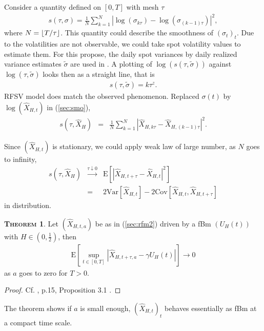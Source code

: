 \documentclass[a4paper, twoside, 11pt]{article}
\theoremstyle{definition}
\newtheorem{theorem}[definition]{\scshape Theorem}
\DeclarePairedDelimiter\floor{\lfloor}{\rfloor}
\begin{document}
Consider a quantity defined on $[0, T]$ with mesh $\tau$
\begin{eqnarray}
  s(\tau, \sigma) = \frac{1}{N}\sum\limits_{k=1}^N|\log(\sigma_{k\tau}) - \log(\sigma_{(k-1)\tau})|^2,
  \label{sec:smo}
\end{eqnarray}
where $N = \floor{T/\tau}$. This quantity could describe the smoothness of $(\sigma_t)_t$. Due to the volatilities are not observable, we could take spot volatility values to estimate them. For this propose, the daily spot variances by daily realized variance estimates $\tilde{\sigma}$ are used in \cite{chridito}. A plotting of $\log(s(\tau, \tilde{\sigma}))$ against $\log(\tau, \tilde{\sigma})$ looks then as a straight line, that is
\begin{eqnarray}
  s(\tau, \tilde{\sigma}) =  k\tau^z.
  \label{sec:smth}
\end{eqnarray}
RFSV model does match the observed phenomenon. Replaced  $\sigma(t)$ by $\log(\hat{X}_{H,t})$ in (\ref{sec:smo}),
\begin{eqnarray}
  s(\tau, \hat{X}_{H}) &=&  \frac {1}{N}\sum\limits_{k=1}^N|\hat{X}_{H,k\tau} - \hat{X}_{H,(k-1)\tau}|^2\nonumber.
\end{eqnarray}

Since $(\hat{X}_{H,t})$ is stationary, we could apply weak law of large number, as $N$ goes to infinity,
\begin{eqnarray}
  s(\tau, \hat{X}_{H}) &\overset{\tau\downarrow0}{\rightarrow}& \mathrm{E}[|\hat{X}_{H,t+\tau}-\hat{X}_{H,t}|^2]\nonumber\\
  &=& 2 \mathrm{Var}[\hat{X}_{H,t}] - 2 \mathrm{Cov}[\hat{X}_{H,t}, \hat{X}_{H,t+\tau}]\nonumber
  \label{sec:smtsv}
\end{eqnarray}
in distribution.
\begin{theorem}
  Let $(\hat{X}_{H, t, a})$ be as in (\ref{sec:rfm2}) driven by a fBm $(U_H(t))$ with $H\in (0,\frac{1}{2})$, then
  \begin{eqnarray*}
	\mathrm{E}[\sup\limits_{t\in [0, T]}|\hat{X}_{H,t+\tau, a} - \gamma U_H(t)|]\rightarrow 0
  \end{eqnarray*}
 as $a$ goes to zero for $T > 0$.
\end{theorem}
\begin{proof}
  Cf. \cite{gradin}, p.15, Proposition 3.1 .
\end{proof}

The theorem shows if $a$ is small enough, $(\hat{X}_{H, t})_t$ behaves essentially as fBm at a compact time scale.
\end{document}
